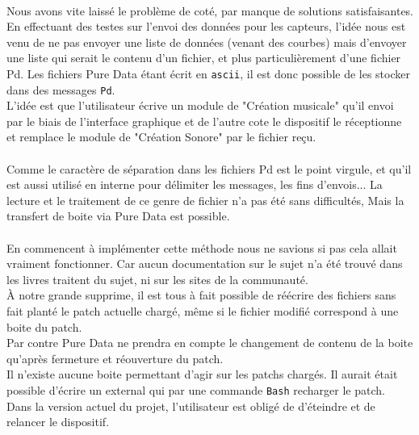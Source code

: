 \documentclass[a4paper, titlepage, oneside, 12pt]{article}%
\begin{document}
\paragraph{}
Nous avons vite laissé le problème de coté, par manque de solutions satisfaisantes.\\
En effectuant des testes sur l'envoi des données pour les capteurs, l'idée nous est venu de ne pas envoyer une liste de données (venant des courbes) mais d'envoyer une liste qui serait le contenu d'un fichier, et plus particulièrement d'une fichier Pd. Les fichiers Pure Data étant écrit en \texttt{ascii}, il est donc possible de les stocker dans des messages \texttt{Pd}.\\
L'idée est que l’utilisateur écrive un module de "Création musicale" qu'il envoi par le biais de l'interface graphique et de l'autre cote le dispositif le réceptionne et remplace le module de "Création Sonore" par le fichier reçu.
\paragraph{}
Comme le caractère de séparation dans les fichiers Pd est le point virgule, et qu'il est aussi utilisé en interne pour délimiter les messages, les fins d'envois... La lecture et le traitement de ce genre de fichier n'a pas été sans difficultés, Mais la transfert de boite via Pure Data est possible.
\paragraph{}
En commencent à implémenter cette méthode nous ne savions si pas cela allait vraiment fonctionner. Car aucun documentation sur le sujet n'a été trouvé dans les livres traitent du sujet, ni sur les sites de la communauté.\\
À notre grande supprime, il est tous à fait possible de réécrire des fichiers sans fait planté le patch actuelle chargé, même si le fichier modifié correspond à une boite du patch.\\
Par contre Pure Data ne prendra en compte le changement de contenu de la boite qu’après fermeture et réouverture du patch.\\
Il n'existe aucune boite permettant d’agir sur les patchs chargés. Il aurait était possible d’écrire un external qui par une commande \texttt{Bash} recharger le patch. Dans la version actuel du projet, l'utilisateur est obligé de d'éteindre et de relancer le dispositif.
\end{document}
